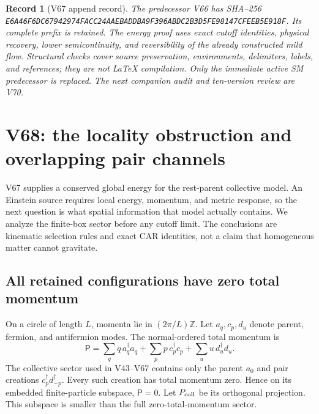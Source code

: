 \documentclass[11pt]{article}
\newtheorem{record}[theorem]{Record}
\theoremstyle{remark}
\begin{document}
\begin{record}[V67 append record]
\label{rec:v20v67}
The predecessor V66 has SHA--256
\texttt{E6A46F6DC67942974FACC24AAEBADDBA9F396ABDC2B3D5FE98147CFEEB5E918F}.
Its complete prefix is retained.  The energy proof
uses exact cutoff identities, physical recovery,
lower semicontinuity, and reversibility of the
already constructed mild flow.  Structural checks
cover source preservation, environments, delimiters,
labels, and references; they are not LaTeX compilation.
Only the immediate active SM predecessor is replaced.
The next companion audit and ten-version review are V70.
\end{record}


\section{V68: the locality obstruction and overlapping pair channels}
\label{sec:v20v68}

V67 supplies a conserved global energy for the rest-parent
collective model.  An Einstein source requires local energy,
momentum, and metric response, so the next question is what
spatial information that model actually contains.  We analyze
the finite-box sector before any cutoff limit.  The conclusions
are kinematic selection rules and exact CAR identities, not
a claim that homogeneous matter cannot gravitate.

\subsection{All retained configurations have zero total momentum}

On a circle of length \(L\), momenta lie in
\((2\pi/L)\mathbb Z\).  Let \(a_q,c_p,d_u\) denote
parent, fermion, and antifermion modes.  The normal-ordered
total momentum is
\[
 \mathsf P=\sum_q q\,a_q^\dagger a_q+
          \sum_p p\,c_p^\dagger c_p+
          \sum_u u\,d_u^\dagger d_u .
\]
The collective sector used in V43--V67 contains only
the parent \(a_0\) and pair creations
\(c_p^\dagger d_{-p}^\dagger\).  Every such creation
has total momentum zero.  Hence on its embedded
finite-particle subspace, \(\mathsf P=0\).
Let \(P_{\rm coll}\) be its orthogonal projection.
This subspace is smaller than the full zero-total-momentum
sector.
\end{document}
